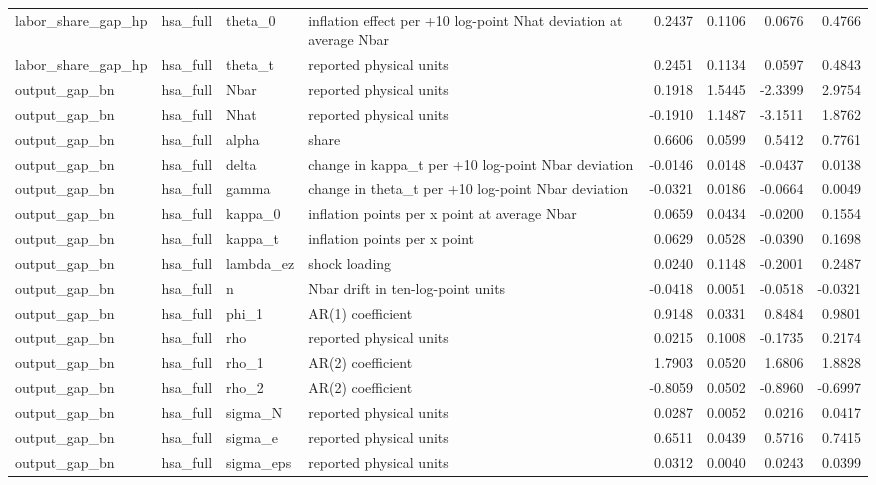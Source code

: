 \begin{tabular}{llllrrrr}
labor\_share\_gap\_hp & hsa\_full & theta\_0 & inflation effect per +10 log-point Nhat deviation at average Nbar & 0.2437 & 0.1106 & 0.0676 & 0.4766 \\
labor\_share\_gap\_hp & hsa\_full & theta\_t & reported physical units & 0.2451 & 0.1134 & 0.0597 & 0.4843 \\
output\_gap\_bn & hsa\_full & Nbar & reported physical units & 0.1918 & 1.5445 & -2.3399 & 2.9754 \\
output\_gap\_bn & hsa\_full & Nhat & reported physical units & -0.1910 & 1.1487 & -3.1511 & 1.8762 \\
output\_gap\_bn & hsa\_full & alpha & share & 0.6606 & 0.0599 & 0.5412 & 0.7761 \\
output\_gap\_bn & hsa\_full & delta & change in kappa\_t per +10 log-point Nbar deviation & -0.0146 & 0.0148 & -0.0437 & 0.0138 \\
output\_gap\_bn & hsa\_full & gamma & change in theta\_t per +10 log-point Nbar deviation & -0.0321 & 0.0186 & -0.0664 & 0.0049 \\
output\_gap\_bn & hsa\_full & kappa\_0 & inflation points per x point at average Nbar & 0.0659 & 0.0434 & -0.0200 & 0.1554 \\
output\_gap\_bn & hsa\_full & kappa\_t & inflation points per x point & 0.0629 & 0.0528 & -0.0390 & 0.1698 \\
output\_gap\_bn & hsa\_full & lambda\_ez & shock loading & 0.0240 & 0.1148 & -0.2001 & 0.2487 \\
output\_gap\_bn & hsa\_full & n & Nbar drift in ten-log-point units & -0.0418 & 0.0051 & -0.0518 & -0.0321 \\
output\_gap\_bn & hsa\_full & phi\_1 & AR(1) coefficient & 0.9148 & 0.0331 & 0.8484 & 0.9801 \\
output\_gap\_bn & hsa\_full & rho & reported physical units & 0.0215 & 0.1008 & -0.1735 & 0.2174 \\
output\_gap\_bn & hsa\_full & rho\_1 & AR(2) coefficient & 1.7903 & 0.0520 & 1.6806 & 1.8828 \\
output\_gap\_bn & hsa\_full & rho\_2 & AR(2) coefficient & -0.8059 & 0.0502 & -0.8960 & -0.6997 \\
output\_gap\_bn & hsa\_full & sigma\_N & reported physical units & 0.0287 & 0.0052 & 0.0216 & 0.0417 \\
output\_gap\_bn & hsa\_full & sigma\_e & reported physical units & 0.6511 & 0.0439 & 0.5716 & 0.7415 \\
output\_gap\_bn & hsa\_full & sigma\_eps & reported physical units & 0.0312 & 0.0040 & 0.0243 & 0.0399 \\

\end{tabular}
